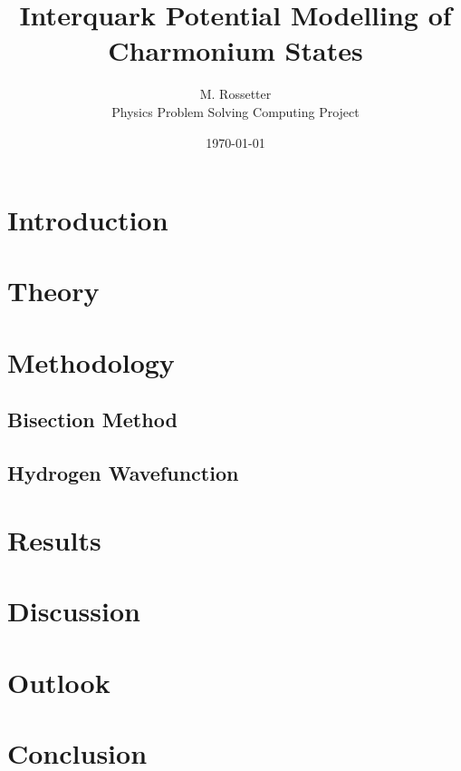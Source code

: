 \documentclass[10pt, twocolumn]{article}
\title{Interquark Potential Modelling of Charmonium States}
\author{M. Rossetter \\ Physics Problem Solving Computing Project}
\date{\vspace{-0.30cm} \today}
\begin{document}
\thispagestyle{plain}

\section{Introduction}

\section{Theory}

\section{Methodology}

\subsection{Bisection Method}

\subsection{Hydrogen Wavefunction}

\section{Results}

\section{Discussion}

\section{Outlook}

\section{Conclusion}
\end{document}
